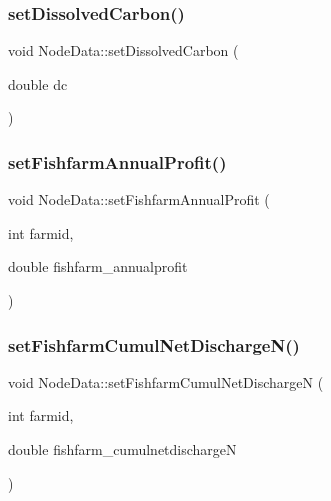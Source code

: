 \subsubsection{\texorpdfstring{setDissolvedCarbon()}{setDissolvedCarbon()}}
{\footnotesize\ttfamily void Node\+Data\+::set\+Dissolved\+Carbon (\begin{DoxyParamCaption}\item[{double}]{dc }\end{DoxyParamCaption})\hspace{0.3cm}{\ttfamily [inline]}}

\mbox{\label{class_node_data_a50c5b5b85c44fe7b2bedc1fb7ff5994a}} 
\subsubsection{\texorpdfstring{setFishfarmAnnualProfit()}{setFishfarmAnnualProfit()}}
{\footnotesize\ttfamily void Node\+Data\+::set\+Fishfarm\+Annual\+Profit (\begin{DoxyParamCaption}\item[{int}]{farmid,  }\item[{double}]{fishfarm\+\_\+annualprofit }\end{DoxyParamCaption})}

\mbox{\label{class_node_data_a28faba9ef597ec271a5bf8393f750126}} 
\subsubsection{\texorpdfstring{setFishfarmCumulNetDischargeN()}{setFishfarmCumulNetDischargeN()}}
{\footnotesize\ttfamily void Node\+Data\+::set\+Fishfarm\+Cumul\+Net\+DischargeN (\begin{DoxyParamCaption}\item[{int}]{farmid,  }\item[{double}]{fishfarm\+\_\+cumulnetdischargeN }\end{DoxyParamCaption})}

\mbox{\label{class_node_data_a0c4ab1157b518fc6f688deb3defbb4a3}} 
